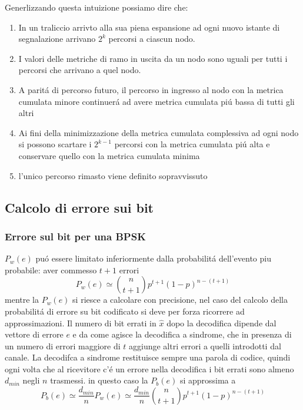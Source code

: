         Generlizzando questa intuizione possiamo dire che:
        \begin{enumerate}
            \item {In un traliccio arrivto alla sua piena espansione ad ogni nuovo istante di segnalazione arrivano $2^k$ percorsi a ciascun nodo.}
            \item {I valori delle metriche di ramo in uscita da un nodo sono uguali per tutti i percorsi che arrivano a quel nodo.}
            \item {A paritá di percorso futuro, il percorso in ingresso al nodo con la metrica cumulata minore continuerá ad avere metrica cumulata piú bassa di tutti gli altri}
            \item {Ai fini della minimizzazione della metrica cumulata complessiva ad ogni nodo si possono scartare i $2^{k-1}$ percorsi con la metrica cumulata 
                piú alta e conservare quello con la metrica cumulata minima
            }
            \item {l'unico percorso rimasto viene definito sopravvissuto}
        \end{enumerate}
    \subsection{Calcolo di errore sui bit}
        \subsubsection{Errore sul bit per una BPSK}
            $P_w(e)$ puó essere limitato inferiormente dalla probabilitá dell'evento piu probabile: aver commesso $t+1$
            errori
            \[
                P_w(e) \simeq \binom{n}{t+1}p^{t+1}(1-p)^{n-(t+1)}
            \]
            mentre la $P_w(e)$ si riesce a calcolare con precisione, nel caso del calcolo della probabilitá di errore 
            su bit codificato si deve per forza ricorrere ad approssimazioni. Il numero di bit errati in $\hat{x}$ dopo la 
            decodifica dipende dal vettore di errore $e$ e da come agisce la decodifica a sindrome, che in presenza di un numero 
            di errori maggiore di $t$ aggiunge altri errori a quelli introdotti dal canale. La decodifca a sindrome restituisce
            sempre una parola di codice, quindi ogni volta che al ricevitore c'é un errore nella decodifica i bit errati sono almeno
            $d_{min}$ negli $n$ trasmessi. in questo caso la $P_b(e)$ si approssima a
            \[
                P_b(e) \simeq\frac{d_{min}}{n}P_w(e)\simeq\frac{d_{min}}{n}\binom{n}{t+1}p^{t+1}(1-p)^{n-(t+1)}  
            \] 

